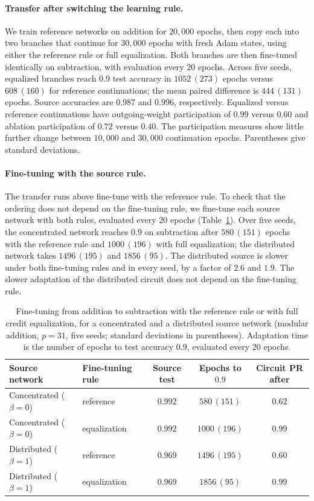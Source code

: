 \documentclass{article} %
\begin{document}
\paragraph{Transfer after switching the learning rule.} We train reference networks on addition for $20{,}000$ epochs, then copy each into two branches that continue for $30{,}000$ epochs with fresh Adam states, using either the reference rule or full equalization. Both branches are then fine-tuned identically on subtraction, with evaluation every $20$ epochs. Across five seeds, equalized branches reach $0.9$ test accuracy in $1052\,(273)$ epochs versus $608\,(160)$ for reference continuations; the mean paired difference is $444\,(131)$ epochs. Source accuracies are $0.987$ and $0.996$, respectively. Equalized versus reference continuations have outgoing-weight participation of $0.99$ versus $0.60$ and ablation participation of $0.72$ versus $0.40$. The participation measures show little further change between $10{,}000$ and $30{,}000$ continuation epochs. Parentheses give standard deviations.

\paragraph{Fine-tuning with the source rule.} The transfer runs above fine-tune with the reference rule. To check that the ordering does not depend on the fine-tuning rule, we fine-tune each source network with both rules, evaluated every $20$ epochs (Table~\ref{tab:ownrule}). Over five seeds, the concentrated network reaches $0.9$ on subtraction after $580\,(151)$ epochs with the reference rule and $1000\,(196)$ with full equalization; the distributed network takes $1496\,(195)$ and $1856\,(95)$. The distributed source is slower under both fine-tuning rules and in every seed, by a factor of $2.6$ and $1.9$. The slower adaptation of the distributed circuit does not depend on the fine-tuning rule.

\begin{table}[!ht]
\caption{Fine-tuning from addition to subtraction with the reference rule or with full credit equalization, for a concentrated and a distributed source network (modular addition, $p=31$, five seeds; standard deviations in parentheses). Adaptation time is the number of epochs to test accuracy $0.9$, evaluated every $20$ epochs.}
\label{tab:ownrule}
\begin{center}
\small
\begin{tabular}{llccc}
\toprule
Source network & Fine-tuning rule & Source test & Epochs to $0.9$ & Circuit PR after \\
\midrule
Concentrated ($\beta{=}0$) & reference & $0.992$ & $580\,(151)$ & $0.62$ \\
Concentrated ($\beta{=}0$) & equalization & $0.992$ & $1000\,(196)$ & $0.99$ \\
Distributed ($\beta{=}1$) & reference & $0.969$ & $1496\,(195)$ & $0.60$ \\
Distributed ($\beta{=}1$) & equalization & $0.969$ & $1856\,(95)$ & $0.99$ \\
\bottomrule
\end{tabular}
\end{center}
\end{table}
\end{document}
